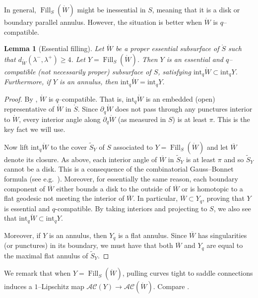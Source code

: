 \documentclass[11pt,letterpaper]{amsart}
\newcommand{\Fill}{\operatorname{Fill}}
\newcommand{\wt}{\widetilde}
\newcommand{\ol}{\overline}
\newcommand{\mr}{\mathring}
\newcommand{\bdy}{\partial} %
\newcommand{\psub}{\mr W}
\numberwithin{equation}{section}
\newtheorem{lemma}[theorem]{Lemma}
\theoremstyle{definition}
\newcommand{\AC}{\mathcal{AC}}
\renewcommand{\int}{\mathrm{int}}
\begin{document}
In general, $\Fill_S(\psub)$ might be inessential in $S$, meaning that it is a disk or boundary parallel annulus. However, the situation is better when $\psub$ is $q$--compatible.
 
 {
 \begin{lemma}[Essential filling]\label{Lem:EssentialFill} \label{Lem:QCompatibleFill}
Let $\psub$ be a proper essential subsurface of $\mr S$ such that $d_{\psub}(\lambda^-,\lambda^+)\ge 4$. Let $Y = \Fill_S(\psub)$. 
Then $Y$ is an essential and $q$--compatible (not necessarily proper) subsurface of $S$, satisfying 
$\int_q \psub \subset \int_q Y$. 
Furthermore, if $Y$ is an annulus, then $\int_q \psub = \int_q Y$.
\end{lemma}


\begin{proof}
By , $\psub$ is $q$--compatible. That is, $\int_q \psub$ is 
 an embedded (open) representative of $\psub$ in $\mr S$. Since $\bdy_q \psub$ does not pass through any punctures interior to $\psub$, every interior angle along $\bdy_q \psub$ (as measured in $S$) is at least $\pi$. This is the key fact we will use.
 
Now lift $\int_q \psub$ to the cover $\wt S_Y$ of $S$ associated to $Y = \Fill_S(\psub)$ and let $\ol W$ denote its closure. As above, each interior angle of $\ol W$ in $\wt S_Y$ is at least $\pi$ and so $\wt S_Y$ cannot be a disk. This is a consequence of the combinatorial Gauss--Bonnet formula (see e.g.~\cite[Theorem 3.3]{Rafi:ShortCurves}).
Moreover, for essentially the same reason, each boundary component of $\ol W$ either bounds a disk to the outside of $\ol W$ or is homotopic to a flat geodesic not meeting the interior of $\ol W$. 
In particular, $\ol W \subset Y_q$, proving that $Y$ is essential and $q$-compatible. By taking interiors and projecting to $S$, we also see that $\int_q \psub \subset \int_q Y$.

Moreover, if $Y$ is an annulus, then $Y_q$ is a flat annulus. Since $\ol W$ has singularities (or punctures) in its boundary, we must have that both $\ol W$ and $Y_q$ are equal to the maximal flat annulus of $\wt S_Y$. 
\qedhere
\end{proof}
}

  
We remark that when $Y = \Fill_S(\psub)$, pulling curves tight to saddle connections induces a $1$--Lipschitz map $\AC(Y) \to \AC(\psub)$. 
Compare .
\end{document}
